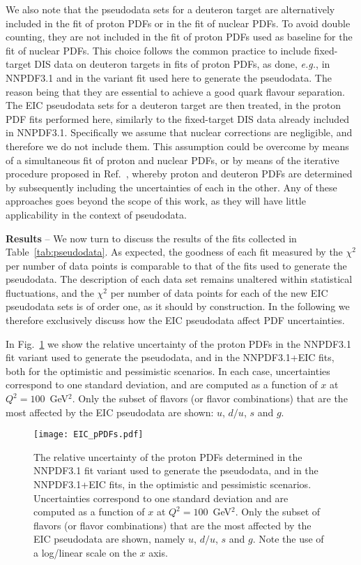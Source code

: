 \documentclass[11pt,a4paper]{article}
\newcommand{\myparagraph}[1]{\vspace{0.2cm} \noindent \textbf{#1} --}
\begin{document}
We also note that the pseudodata sets for a deuteron target are alternatively
included in the fit of proton PDFs or in the fit of nuclear PDFs. To avoid
double counting, they are not included in the fit of proton PDFs used
as baseline for the fit of nuclear PDFs. This choice follows the common
practice to include fixed-target DIS data on deuteron targets in fits of proton
PDFs, as done, {\it e.g.}, in NNPDF3.1 and in the variant fit used here to
generate the pseudodata. The reason being that they are essential to achieve a
good quark flavour separation. The EIC pseudodata sets for a deuteron target
are then treated, in the proton PDF fits performed here, similarly to the
fixed-target DIS data already included in NNPDF3.1. Specifically we assume
that nuclear corrections are negligible, and therefore we do not include them.
This assumption could be overcome by means of a simultaneous fit of proton and
nuclear PDFs, or by means of the iterative procedure proposed
in Ref.~\cite{Ball:2020xqw}, whereby proton and deuteron PDFs are determined by
subsequently including the uncertainties of each in the other. Any of these
approaches goes beyond the scope of this work, as they will have little
applicability in the context of pseudodata.

\myparagraph{Results} We now turn to discuss the results of the fits collected
in Table~\ref{tab:pseudodata}. As expected, the goodness of each fit 
measured by the $\chi^2$ per number of data points is comparable to that of the
fits used to generate the pseudodata. The description of each data set remains
unaltered within statistical fluctuations, and the $\chi^2$ per
number of data points for each of the new EIC pseudodata sets is of order one,
as it should by construction. In the following we therefore exclusively discuss
how the EIC pseudodata affect PDF uncertainties.

In Fig.~\ref{fig:ppdfs} we show the relative uncertainty of the proton PDFs
in the NNPDF3.1 fit variant used to generate the pseudodata, and in the
NNPDF3.1+EIC fits, both for the optimistic and pessimistic scenarios. In each
case, uncertainties correspond to one standard deviation, and are computed
as a function of $x$ at $Q^2=100$~GeV$^2$. Only the subset of flavors (or
flavor combinations) that are the most affected by the EIC
pseudodata are shown: $u$, $d/u$, $s$ and $g$.

\begin{figure}[!t]
  \centering
  \texttt{[image: EIC\_pPDFs.pdf]}
  \caption{The relative uncertainty of the proton PDFs determined in the
  NNPDF3.1 fit variant used to generate the pseudodata, and in the
  NNPDF3.1+EIC fits, in the optimistic and pessimistic scenarios. Uncertainties
  correspond to one standard deviation and are computed as a function of $x$
  at $Q^2=100$~GeV$^2$. Only the subset of flavors (or flavor combinations) that
  are the most affected by the EIC pseudodata are shown, namely $u$,
  $d/u$, $s$ and $g$. Note the use of a log/linear scale on the $x$ axis.}
  \label{fig:ppdfs}
\end{figure}
\end{document}

